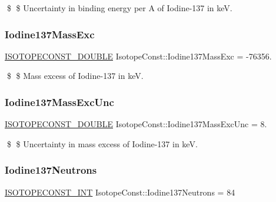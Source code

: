 \$ \$ Uncertainty in binding energy per A of Iodine-\/137 in keV. \mbox{\label{group___isotope_const-_iodine-_i137_gaf8f7dd18d5c830c3c3ed383bfd9029b5}} 
\subsubsection{\texorpdfstring{Iodine137\+Mass\+Exc}{Iodine137MassExc}}
{\footnotesize\ttfamily \mbox{\hyperlink{group___isotope_const-_macros_ga8f45a7272ce02c0b4c65c44636ed719a}{I\+S\+O\+T\+O\+P\+E\+C\+O\+N\+S\+T\+\_\+\+D\+O\+U\+B\+LE}} Isotope\+Const\+::\+Iodine137\+Mass\+Exc = -\/76356.}

\$ \$ Mass excess of Iodine-\/137 in keV. \mbox{\label{group___isotope_const-_iodine-_i137_ga45bf17a2c9ddf7263057812db72d8f90}} 
\subsubsection{\texorpdfstring{Iodine137\+Mass\+Exc\+Unc}{Iodine137MassExcUnc}}
{\footnotesize\ttfamily \mbox{\hyperlink{group___isotope_const-_macros_ga8f45a7272ce02c0b4c65c44636ed719a}{I\+S\+O\+T\+O\+P\+E\+C\+O\+N\+S\+T\+\_\+\+D\+O\+U\+B\+LE}} Isotope\+Const\+::\+Iodine137\+Mass\+Exc\+Unc = 8.}

\$ \$ Uncertainty in mass excess of Iodine-\/137 in keV. \mbox{\label{group___isotope_const-_iodine-_i137_ga399d2bc6a6edae5814cd8c199d2068dd}} 
\subsubsection{\texorpdfstring{Iodine137\+Neutrons}{Iodine137Neutrons}}
{\footnotesize\ttfamily \mbox{\hyperlink{group___isotope_const-_macros_ga5f18360b3e99483a35c32d789e62621c}{I\+S\+O\+T\+O\+P\+E\+C\+O\+N\+S\+T\+\_\+\+I\+NT}} Isotope\+Const\+::\+Iodine137\+Neutrons = 84}

